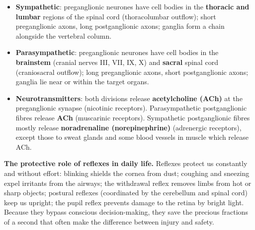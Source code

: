 \documentclass[11pt]{article}
\begin{document}
\begin{aretenir}
\begin{itemize}
\item \textbf{Sympathetic}: preganglionic neurones have cell bodies in the \textbf{thoracic and lumbar} regions of the spinal cord (thoracolumbar outflow); short preganglionic axons, long postganglionic axons; ganglia form a chain alongside the vertebral column.
\item \textbf{Parasympathetic}: preganglionic neurones have cell bodies in the \textbf{brainstem} (cranial nerves III, VII, IX, X) and \textbf{sacral} spinal cord (craniosacral outflow); long preganglionic axons, short postganglionic axons; ganglia lie near or within the target organs.
\item \textbf{Neurotransmitters}: both divisions release \textbf{acetylcholine (ACh)} at the preganglionic synapse (nicotinic receptors). Parasympathetic postganglionic fibres release \textbf{ACh} (muscarinic receptors). Sympathetic postganglionic fibres mostly release \textbf{noradrenaline (norepinephrine)} (adrenergic receptors), except those to sweat glands and some blood vessels in muscle which release ACh.
\end{itemize}
\end{aretenir}

\textbf{The protective role of reflexes in daily life.} Reflexes protect us constantly and without effort: blinking shields the cornea from dust; coughing and sneezing expel irritants from the airways; the withdrawal reflex removes limbs from hot or sharp objects; postural reflexes (coordinated by the cerebellum and spinal cord) keep us upright; the pupil reflex prevents damage to the retina by bright light. Because they bypass conscious decision-making, they save the precious fractions of a second that often make the difference between injury and safety.
\end{document}
